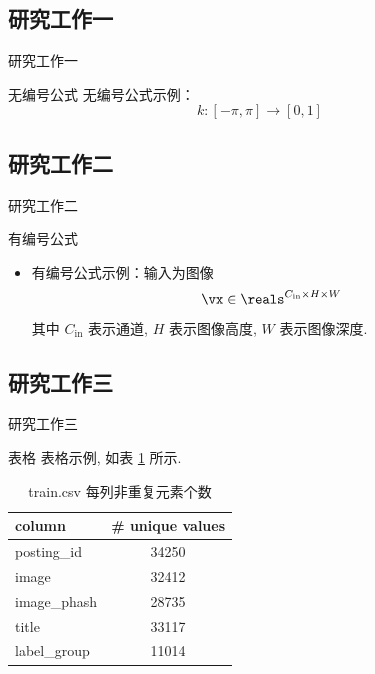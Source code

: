 \documentclass{beamer}
\begin{document}
\subsection{研究工作一}

\begin{frame}{研究工作一}
  \begin{block}{无编号公式}
    无编号公式示例：
    $$
      k:[-\pi,\pi] \rightarrow [0,1]
    $$
  \end{block}
\end{frame}

\subsection{研究工作二}

\begin{frame}{研究工作二}
  \begin{block}{有编号公式}
    \begin{itemize}
      \item 有编号公式示例：输入为图像 
      \begin{equation}
        \vx\in\reals^{C_{\text{in}}\times H\times W}
      \end{equation}
      其中 $C_{\text{in}}$ 表示通道, $H$ 表示图像高度, $W$ 表示图像深度.
    \end{itemize}
  \end{block}
\end{frame}

\subsection{研究工作三}

\begin{frame}{研究工作三}
  \begin{block}{表格}
    表格示例, 如表 \ref{tab:unique_values} 所示. 

    \begin{table}[htbp]
      \small
      \centering
      \caption{train.csv 每列非重复元素个数}
      \label{tab:unique_values}
      \begin{tabular}{lc}
        \toprule
        column & \# unique values \\
        \midrule
        posting\_id & 34250 \\
        image & 32412 \\
        image\_phash & 28735 \\
        title & 33117 \\
        label\_group & 11014 \\
        \bottomrule
      \end{tabular}
    \end{table}
  \end{block}
\end{frame}
\end{document}
